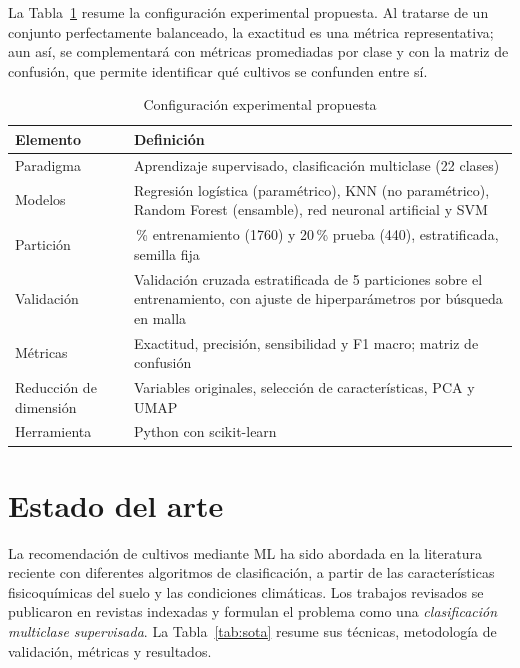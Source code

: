 \documentclass[conference]{IEEEtran}
\begin{document}
La Tabla~\ref{tab:diseno} resume la configuración experimental propuesta. Al tratarse de un conjunto perfectamente balanceado, la exactitud es una métrica representativa; aun así, se complementará con métricas promediadas por clase y con la matriz de confusión, que permite identificar qué cultivos se confunden entre sí.

\begin{table}[htbp]
\caption{Configuración experimental propuesta}
\label{tab:diseno}
\centering
\footnotesize
\begin{tabular}{>{\raggedright\arraybackslash}p{2.1cm}>{\raggedright\arraybackslash}p{5.3cm}}
\toprule
\textbf{Elemento} & \textbf{Definición} \\
\midrule
Paradigma & Aprendizaje supervisado, clasificación multiclase (22 clases) \\
Modelos & Regresión logística (paramétrico), KNN (no paramétrico), Random Forest (ensamble), red neuronal artificial y SVM \\
Partición & 80\,\% entrenamiento (1760) y 20\,\% prueba (440), estratificada, semilla fija \\
Validación & Validación cruzada estratificada de 5 particiones sobre el entrenamiento, con ajuste de hiperparámetros por búsqueda en malla \\
Métricas & Exactitud, precisión, sensibilidad y F1 macro; matriz de confusión \\
Reducción de dimensión & Variables originales, selección de características, PCA y UMAP \\
Herramienta & Python con scikit-learn \cite{pedregosa2011} \\
\bottomrule
\end{tabular}
\end{table}

\section{Estado del arte}
\label{sec:sota}

La recomendación de cultivos mediante ML ha sido abordada en la literatura reciente con diferentes algoritmos de clasificación, a partir de las características fisicoquímicas del suelo y las condiciones climáticas. Los trabajos revisados se publicaron en revistas indexadas y formulan el problema como una \emph{clasificación multiclase supervisada}. La Tabla~\ref{tab:sota} resume sus técnicas, metodología de validación, métricas y resultados.
\end{document}
